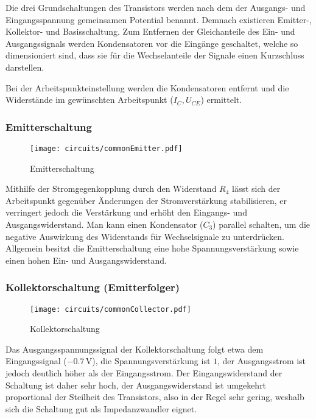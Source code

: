 Die drei Grundschaltungen des Transistors werden nach dem der Ausgangs- und
Eingangsspannung gemeinsamen Potential benannt. Demnach existieren Emitter-,
Kollektor- und Basisschaltung. Zum Entfernen der Gleichanteile des Ein- und
Ausgangssignals werden Kondensatoren vor die Eingänge geschaltet, welche so
dimensioniert sind, dass sie für die Wechselanteile der Signale einen
Kurzschluss darstellen.

Bei der Arbeitspunkteinstellung werden die Kondensatoren entfernt und die
Widerstände im gewünschten Arbeitspunkt ($I_C, U_{CE}$) ermittelt.

\subsubsection{Emitterschaltung}

\begin{figure}[H]
  \begin{center}
    \texttt{[image: circuits/commonEmitter.pdf]}
  \end{center}
  \caption{Emitterschaltung}
\end{figure}

Mithilfe der Stromgegenkopplung durch den Widerstand $R_4$ lässt sich der
Arbeitspunkt gegenüber Änderungen der Stromverstärkung stabilisieren, er
verringert jedoch die Verstärkung und erhöht den Eingangs- und Ausgangswiderstand.
Man kann einen Kondensator ($C_3$) parallel schalten, um die negative Auswirkung
des Widerstands für Wechselsignale zu unterdrücken. Allgemein besitzt die
Emitterschaltung eine hohe Spannungsverstärkung sowie einen hohen Ein- und
Ausgangswiderstand.

\subsubsection{Kollektorschaltung (Emitterfolger)}
\begin{figure}[H]
  \begin{center}
    \texttt{[image: circuits/commonCollector.pdf]}
  \end{center}
  \caption{Kollektorschaltung}
\end{figure}

Das Ausgangsspannungssignal der Kollektorschaltung folgt etwa dem Eingangssignal
($-0.7\,\si{\volt}$), die Spannungsverstärkung ist $1$, der Ausgangsstrom ist
jedoch deutlich höher als der Eingangsstrom. Der Eingangswiderstand
der Schaltung ist daher sehr hoch, der Ausgangswiderstand ist umgekehrt proportional
der Steilheit des Transistors, also in der Regel sehr gering, weshalb sich die
Schaltung gut als Impedanzwandler eignet. 

